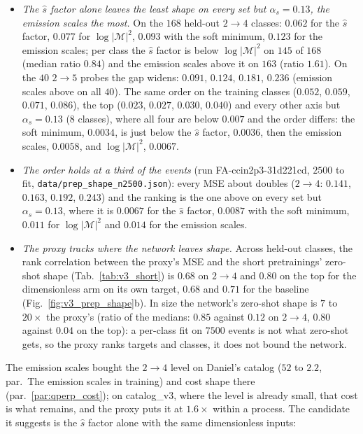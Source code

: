 \documentclass[11pt]{article}
\newcommand{\code}[1]{\texttt{#1}}
\begin{document}
\begin{itemize}
  \item \emph{The $\hat s$ factor alone leaves the least shape on every set but $\alpha_s=0.13$, the emission scales the most.} On the $168$
    held-out $2\to4$ classes: $0.062$ for the $\hat s$ factor, $0.077$ for $\log|\mathcal M|^2$, $0.093$ with the soft
    minimum, $0.123$ for the emission scales; per class the $\hat s$ factor is below $\log|\mathcal M|^2$ on $145$ of $168$
    (median ratio $0.84$) and the emission scales above it on $163$ (ratio $1.61$). On the $40$ $2\to5$ probes the gap
    widens: $0.091$, $0.124$, $0.181$, $0.236$ (emission scales above on all $40$). The same order on the training classes
    ($0.052$, $0.059$, $0.071$, $0.086$), the top ($0.023$, $0.027$, $0.030$, $0.040$) and every other axis but
    $\alpha_s=0.13$ ($8$ classes), where all four are below $0.007$ and the order differs: the soft minimum, $0.0034$, is just
    below the $\hat s$ factor, $0.0036$, then the emission scales, $0.0058$, and $\log|\mathcal M|^2$, $0.0067$.
  \item \emph{The order holds at a third of the events} (run FA-ccin2p3-31d221cd, $2500$ to fit,
    \code{data/prep\_shape\_n2500.json}): every MSE about doubles ($2\to4$: $0.141$, $0.163$, $0.192$, $0.243$) and the
    ranking is the one above on every set but $\alpha_s=0.13$, where it is $0.0067$ for the $\hat s$ factor, $0.0087$ with
    the soft minimum, $0.011$ for $\log|\mathcal M|^2$ and $0.014$ for the emission scales.
  \item \emph{The proxy tracks where the network leaves shape.} Across held-out classes, the rank correlation between the
    proxy's MSE and the short pretrainings' zero-shot shape (Tab.~\ref{tab:v3_short}) is $0.68$ on $2\to4$ and $0.80$ on
    the top for the dimensionless arm on its own target, $0.68$ and $0.71$ for the baseline (Fig.~\ref{fig:v3_prep_shape}b).
    In size the network's zero-shot shape is $7$ to $20\times$ the proxy's (ratio of the medians: $0.85$ against $0.12$ on
    $2\to4$, $0.80$ against $0.04$ on the top): a per-class fit on $7500$ events is not what zero-shot gets, so the proxy ranks targets and
    classes, it does not bound the network.
\end{itemize}
The emission scales bought the $2\to4$ level on Daniel's catalog ($52$ to $2.2$, par.\ The emission scales in training) and
cost shape there (par.~\ref{par:qperp_cost}); on catalog\_v3, where the level is already small, that cost is what remains, and the proxy puts it at
$1.6\times$ within a process. The candidate it suggests is the $\hat s$ factor alone with the same dimensionless inputs:
\end{document}
